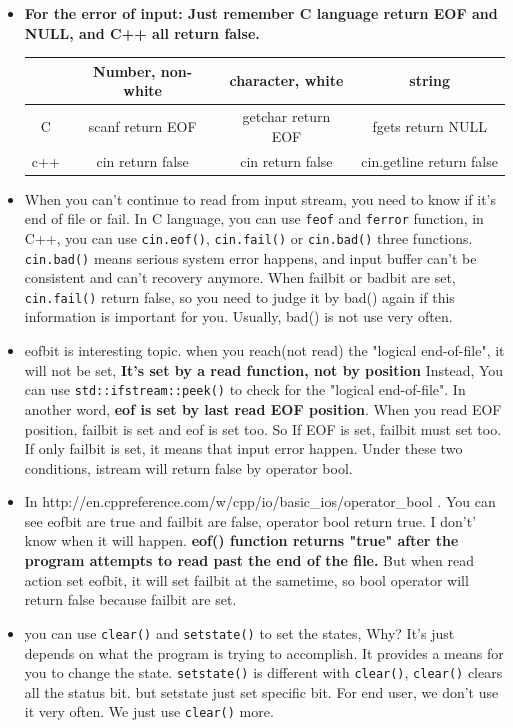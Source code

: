 \documentclass[a4paper,11pt,twoside]{book}
\newcommand{\tophline}{\hline }
\newcommand{\bottomhline}{\\ \hline }
\newcommand{\tophline}{ }
\newcommand{\bottomhline}{ }
\begin{document}
\begin{itemize}
	\item \textbf{For the error of input: Just remember C language return EOF and NULL, and C++ all return false. }
	
	\begin{tabular}{|c|c|c|c|}
		\tophline
		& Number, non-white & character, white  & string \\
		\tophline
		C & scanf return EOF & getchar return EOF & fgets return NULL \\
		\tophline
		c++ & cin return false & cin return false & cin.getline return false \bottomhline
	\end{tabular}
	
	\item When you can't continue to read from input stream, you need to know if it's end of file or fail. In C language, you can use \texttt{feof} and \texttt{ferror} function, in C++, you can use \texttt{cin.eof()}, \texttt{cin.fail()} or \texttt{cin.bad()} three functions. \texttt{cin.bad()} means serious system error happens, and input buffer can't be consistent and can't recovery anymore.  When failbit or badbit are set, \texttt{cin.fail()} return false, so you need to judge it by bad() again if this information is important for you.  Usually, bad() is not use very often.
	
	\item eofbit is interesting topic. when you reach(not read) the "logical end-of-file", it will not be set, \textbf{It's set by a read function, not by position}   Instead,  You can use \texttt{std::ifstream::peek()} to check for the "logical end-of-file". In another word, \textbf{eof is set by last read EOF position}. When you read EOF position, failbit is set and eof is set too. So If EOF is set, failbit must set too.  If only failbit is set, it means that input error happen.  Under these two conditions, istream will return false by operator bool.
	
	\item In http://en.cppreference.com/w/cpp/io/basic\_ios/operator\_bool . You can see eofbit are true and failbit are false, operator bool return true. I don't' know when it will happen. \textbf{ eof() function returns "true" after the program attempts to read past the end of the file.}  But when read action set eofbit, it will set failbit at the sametime, so bool operator will return false because failbit are set.
		
	
	\item you can use \texttt{clear()} and \texttt{setstate()} to set the states, Why? It's just depends on what the program is trying to accomplish.  It provides a means for you to change the state. \texttt{setstate()} is different with \texttt{clear()}, \texttt{clear()} clears all the status bit. but setstate just set specific bit. For end user, we don't use it very often. We just use \texttt{clear()} more.


\end{itemize}
\end{document}
